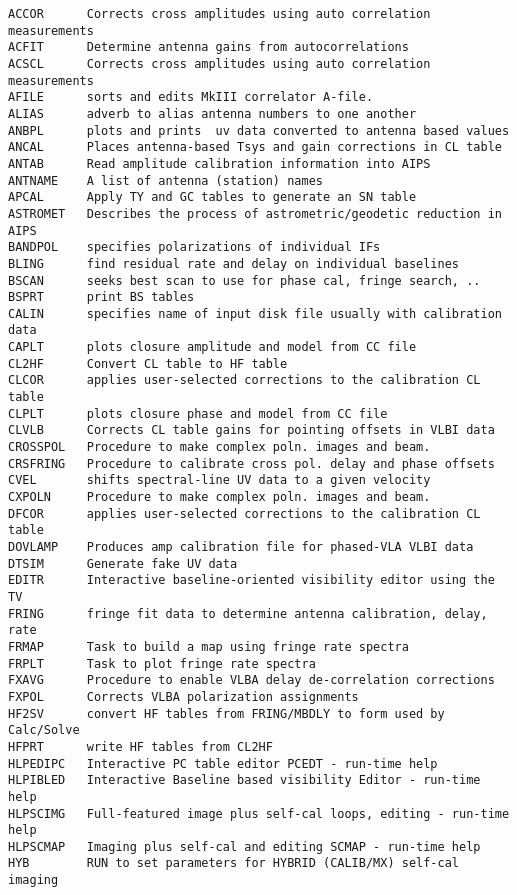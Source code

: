 \vskip 0.5pt
\bbve\begin{verbatim}
ACCOR      Corrects cross amplitudes using auto correlation measurements
ACFIT      Determine antenna gains from autocorrelations
ACSCL      Corrects cross amplitudes using auto correlation measurements
AFILE      sorts and edits MkIII correlator A-file.
ALIAS      adverb to alias antenna numbers to one another
ANBPL      plots and prints  uv data converted to antenna based values
ANCAL      Places antenna-based Tsys and gain corrections in CL table
ANTAB      Read amplitude calibration information into AIPS
ANTNAME    A list of antenna (station) names
APCAL      Apply TY and GC tables to generate an SN table
ASTROMET   Describes the process of astrometric/geodetic reduction in AIPS
BANDPOL    specifies polarizations of individual IFs
BLING      find residual rate and delay on individual baselines
BSCAN      seeks best scan to use for phase cal, fringe search, ..
BSPRT      print BS tables
CALIN      specifies name of input disk file usually with calibration data
CAPLT      plots closure amplitude and model from CC file
CL2HF      Convert CL table to HF table
CLCOR      applies user-selected corrections to the calibration CL table
CLPLT      plots closure phase and model from CC file
CLVLB      Corrects CL table gains for pointing offsets in VLBI data
CROSSPOL   Procedure to make complex poln. images and beam.
CRSFRING   Procedure to calibrate cross pol. delay and phase offsets
CVEL       shifts spectral-line UV data to a given velocity
CXPOLN     Procedure to make complex poln. images and beam.
DFCOR      applies user-selected corrections to the calibration CL table
DOVLAMP    Produces amp calibration file for phased-VLA VLBI data
DTSIM      Generate fake UV data
EDITR      Interactive baseline-oriented visibility editor using the TV
FRING      fringe fit data to determine antenna calibration, delay, rate
FRMAP      Task to build a map using fringe rate spectra
FRPLT      Task to plot fringe rate spectra
FXAVG      Procedure to enable VLBA delay de-correlation corrections
FXPOL      Corrects VLBA polarization assignments
HF2SV      convert HF tables from FRING/MBDLY to form used by Calc/Solve
HFPRT      write HF tables from CL2HF
HLPEDIPC   Interactive PC table editor PCEDT - run-time help
HLPIBLED   Interactive Baseline based visibility Editor - run-time help
HLPSCIMG   Full-featured image plus self-cal loops, editing - run-time help
HLPSCMAP   Imaging plus self-cal and editing SCMAP - run-time help
HYB        RUN to set parameters for HYBRID (CALIB/MX) self-cal imaging

\end{verbatim}
